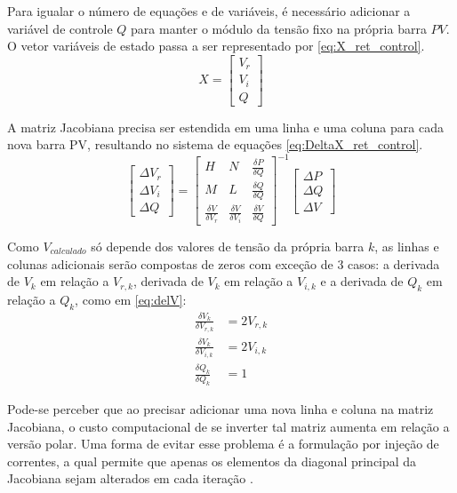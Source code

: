 Para igualar o número de equações e de variáveis, é necessário adicionar a variável de controle $Q$ para manter o módulo da tensão fixo na própria barra $PV$. O vetor variáveis de estado passa a ser representado por \eqref{eq:X_ret_control}.
\begin{equation}\label{eq:X_ret_control}
    X =
    \begin{bmatrix}
        V_r\\
        V_i\\
        Q
    \end{bmatrix}    
\end{equation}

A matriz Jacobiana precisa ser estendida em uma linha e uma coluna para cada nova barra PV, resultando no sistema de equações \eqref{eq:DeltaX_ret_control}.
\begin{equation}\label{eq:DeltaX_ret_control}
    \begin{bmatrix}
        \Delta V_r\\
        \Delta V_i\\
        \Delta Q
    \end{bmatrix}
    =
    \begin{bmatrix}
        H & N & \frac{\delta P}{\delta Q}\\
        M & L &\frac{\delta Q}{\delta Q}\\
        \frac{\delta V}{\delta V_r}&\frac{\delta V}{\delta V_i}&\frac{\delta V}{\delta Q}
    \end{bmatrix}
    ^{-1}
    \begin{bmatrix}
        \Delta P\\
        \Delta Q\\
        \Delta V
    \end{bmatrix}
\end{equation}

Como $V_{calculado}$ só depende dos valores de tensão da própria barra $k$, as linhas e colunas adicionais serão compostas de zeros com exceção de 3 casos: a derivada de $V_k$ em relação a $V_{r,k}$, derivada de $V_k$ em relação a $V_{i,k}$ e a derivada de $Q_k$ em relação a $Q_k$, como em \eqref{eq:delV}:
\begin{equation}\label{eq:delV}
    \begin{split}
    \frac{\delta V_k}{\delta V_{r,k}}&=2V_{r,k}\\
    \frac{\delta V_k}{\delta V_{i,k}}&=2V_{i,k}\\
    \frac{\delta Q_k}{\delta Q_k}&=1
    \end{split}
\end{equation}

Pode-se perceber que ao precisar adicionar uma nova linha e coluna na matriz Jacobiana, o custo computacional de se inverter tal matriz aumenta em relação a versão polar. 
Uma forma de evitar esse problema é a formulação por injeção de correntes, a qual permite que apenas os elementos da diagonal principal da Jacobiana sejam alterados em cada iteração \cite{Leandro}.